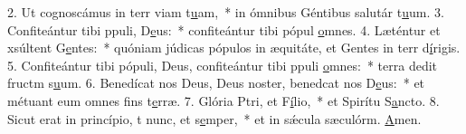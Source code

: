 2. Ut cognoscámus in terr viam t\uline{u}am,~* in ómnibus Géntibus salutár t\uline{u}um.
3. Confiteántur tibi ppuli, D\uline{e}us:~* confiteántur tibi pópul \uline{o}mnes.
4. Læténtur et xsúltent G\uline{e}ntes:~* quóniam júdicas pópulos in æquitáte, et Gentes in terr d\uline{í}rigis.
5. Confiteántur tibi pópuli, Deus, confiteántur tibi ppuli \uline{o}mnes:~* terra dedit fructm s\uline{u}um.
6. Benedícat nos Deus, Deus noster, benedcat nos D\uline{e}us:~* et métuant eum omnes fins t\uline{e}rræ.
7. Glória Ptri, et F\uline{í}lio,~* et Spirítu S\uline{a}ncto.
8. Sicut erat in princípio, t nunc, et s\uline{e}mper,~* et in sǽcula sæculórm. \uline{A}men.
